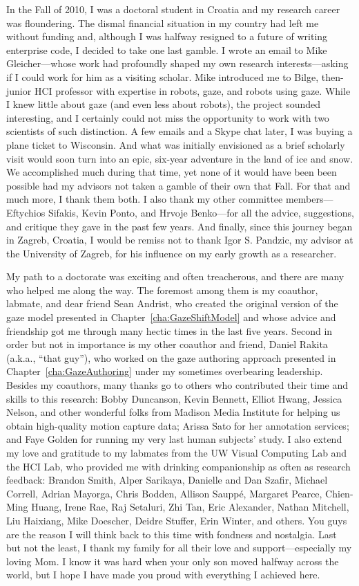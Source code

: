 In the Fall of 2010, I was a doctoral student in Croatia and my research career was floundering. The dismal financial situation in my country had left me without funding and, although I was halfway resigned to a future of writing enterprise code, I decided to take one last gamble. I wrote an email to Mike Gleicher---whose work had profoundly shaped my own research interests---asking if I could work for him as a visiting scholar. Mike introduced me to Bilge, then-junior HCI professor with expertise in robots, gaze, and robots using gaze. While I knew little about gaze (and even less about robots), the project sounded interesting, and I certainly could not miss the opportunity to work with two scientists of such distinction. A few emails and a Skype chat later, I was buying a plane ticket to Wisconsin. And what was initially envisioned as a brief scholarly visit would soon turn into an epic, six-year adventure in the land of ice and snow. We accomplished much during that time, yet none of it would have been been possible had my advisors not taken a gamble of their own that Fall. For that and much more, I thank them both. I also thank my other committee members---Eftychios Sifakis, Kevin Ponto, and Hrvoje Benko---for all the advice, suggestions, and critique they gave in the past few years. And finally, since this journey began in Zagreb, Croatia, I would be remiss not to thank Igor S. Pandzic, my advisor at the University of Zagreb, for his influence on my early growth as a researcher.

My path to a doctorate was exciting and often treacherous, and there are many who helped me along the way. The foremost among them is my coauthor, labmate, and dear friend Sean Andrist, who created the original version of the gaze model presented in Chapter~\ref{cha:GazeShiftModel} and whose advice and friendship got me through many hectic times in the last five years. Second in order but not in importance is my other coauthor and friend, Daniel Rakita (a.k.a., ``that guy''), who worked on the gaze authoring approach presented in Chapter~\ref{cha:GazeAuthoring} under my sometimes overbearing leadership. Besides my coauthors, many thanks go to others who contributed their time and skills to this research: Bobby Duncanson, Kevin Bennett, Elliot Hwang, Jessica Nelson, and other wonderful folks from Madison Media Institute for helping us obtain high-quality motion capture data; Arissa Sato for her annotation services; and Faye Golden for running my very last human subjects' study. I also extend my love and gratitude to my labmates from the UW Visual Computing Lab and the HCI Lab, who provided me with drinking companionship as often as research feedback: Brandon Smith, Alper Sarikaya, Danielle and Dan Szafir, Michael Correll, Adrian Mayorga, Chris Bodden, Allison Saupp\'{e}, Margaret Pearce, Chien-Ming Huang, Irene Rae, Raj Setaluri, Zhi Tan, Eric Alexander, Nathan Mitchell, Liu Haixiang, Mike Doescher, Deidre Stuffer, Erin Winter, and others. You guys are the reason I will think back to this time with fondness and nostalgia. Last but not the least, I thank my family for all their love and support---especially my loving Mom. I know it was hard when your only son moved halfway across the world, but I hope I have made you proud with everything I achieved here. 